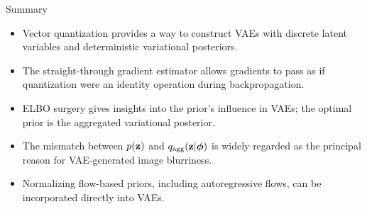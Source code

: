 \documentclass{beamer}
\begin{document}
\begin{frame}{Summary}
	\begin{itemize}
		\item Vector quantization provides a way to construct VAEs with discrete latent variables and deterministic variational posteriors.
		\vfill
		\item The straight-through gradient estimator allows gradients to pass as if quantization were an identity operation during backpropagation.			
		\vfill
		\item ELBO surgery gives insights into the prior's influence in VAEs; the optimal prior is the aggregated variational posterior. 
		\vfill
		\item The mismatch between $p(\mathbf{z})$ and $q_{\text{agg}}(\mathbf{z} | \boldsymbol{\phi})$ is widely regarded as the principal reason for VAE-generated image blurriness.
		\vfill
		\item Normalizing flow-based priors, including autoregressive flows, can be incorporated directly into VAEs.	
	\end{itemize}
\end{frame}
\end{document}
